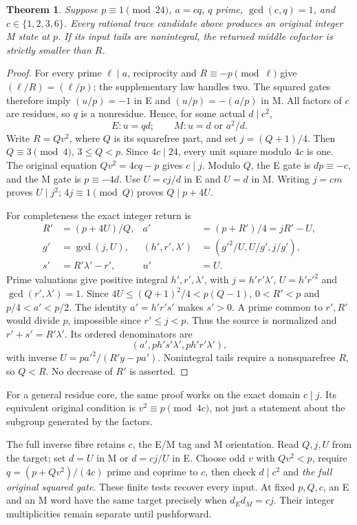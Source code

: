\documentclass[10pt,reqno]{amsart}
\newtheorem{theorem}{Theorem}\newtheorem{lemma}[theorem]{Lemma}
\begin{document}
\begin{theorem}\label{t:core}
Suppose $p\equiv1\pmod{24}$, $a=cq$, $q$ prime, $\gcd(c,q)=1$, and
$c\in\{1,2,3,6\}$. Every rational trace candidate above produces an original
integer M state at $p$. If its input tails are nonintegral, the returned middle
cofactor is strictly smaller than $R$.
\end{theorem}
\begin{proof}
For every prime $\ell\mid a$, reciprocity and $R\equiv-p\pmod\ell$ give
$(\ell/R)=(\ell/p)$; the supplementary law handles two. The squared gates
therefore imply $(u/p)=-1$ in E and $(u/p)=-(a/p)$ in M. All factors of $c$
are residues, so $q$ is a nonresidue. Hence, for some actual $d\mid c^2$,
\[
 E:u=qd;\qquad M:u=d\text{ or }a^2/d.
\]
Write $R=Qv^2$, where $Q$ is its squarefree part, and set $j=(Q+1)/4$.
Then $Q\equiv3\pmod4$, $3\le Q<p$. Since $4c\mid24$, every unit square
modulo $4c$ is one. The original equation $Qv^2=4cq-p$ gives $c\mid j$.
Modulo $Q$, the E gate is $dp\equiv-c$, and the M gate is $p\equiv-4d$.
Use $U=cj/d$ in E and $U=d$ in M. Writing $j=cm$ proves $U\mid j^2$;
$4j\equiv1\pmod Q$ proves $Q\mid p+4U$.

For completeness the exact integer return is
\begin{align*}
 R'&=(p+4U)/Q,&a'&=(p+R')/4=jR'-U,\\
 g'&=\gcd(j,U),&(h',r',\lambda')&=(g'^2/U,U/g',j/g'),\\
 s'&=R'\lambda'-r',&u'&=U.
\end{align*}
Prime valuations give positive integral $h',r',\lambda'$, with
$j=h'r'\lambda'$, $U=h'r'^2$ and $\gcd(r',\lambda')=1$.
Since $4U\le(Q+1)^2/4<p(Q-1)$, $0<R'<p$ and $p/4<a'<p/2$.
The identity $a'=h'r's'$ makes $s'>0$. A prime common to $r',R'$ would divide
$p$, impossible since $r'\le j<p$. Thus the source is normalized and
$r'+s'=R'\lambda'$. Its ordered denominators are
\[
 (a',ph's'\lambda',ph'r'\lambda'),
\]
with inverse $U=pa'^2/(R'y-pa')$. Nonintegral tails require a nonsquarefree
$R$, so $Q<R$. No decrease of $R'$ is asserted.
\end{proof}
For a general residue core, the same proof works on the exact domain $c\mid j$.
Its equivalent original condition is $v^2\equiv p\pmod{4c}$, not just a statement
about the subgroup generated by the factors.

The full inverse fibre retains $c$, the E/M tag and M orientation. Read $Q,j,U$
from the target; set $d=U$ in M or $d=cj/U$ in E. Choose odd $v$ with $Qv^2<p$,
require $q=(p+Qv^2)/(4c)$ prime and coprime to $c$, then check $d\mid c^2$ and
\emph{the full original squared gate}. These finite tests recover every input.
At fixed $p,Q,c$, an E and an M word have the same target precisely when
$d_Ed_M=cj$. Their integer multiplicities remain separate until pushforward.
\end{document}
